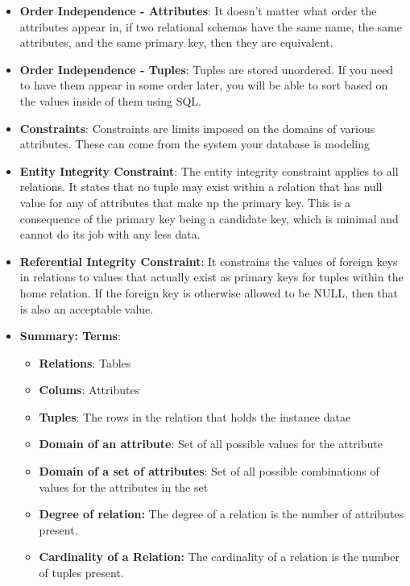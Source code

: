 \documentclass{report}
\begin{document}
\begin{itemize}
        \item \textbf{Order Independence - Attributes}: It doesn’t matter what order the attributes appear in, if two relational schemas have the same name, the same attributes, and the same primary key, then they are equivalent.
        \item \textbf{Order Independence - Tuples}: Tuples are stored unordered. If you need to have them appear in some order later, you will be able to sort based on the values inside of them using SQL.
        \item \textbf{Constraints}: Constraints are limits imposed on the domains of various attributes. These can come from the system your database is modeling
        \item \textbf{Entity Integrity Constraint}: The entity integrity constraint applies to all relations. It states that no tuple may exist within a relation that has null value for any of attributes that make up the primary key. This is a consequence of the primary key being a candidate key, which is minimal and cannot do its job with any less data.
        \item \textbf{Referential Integrity Constraint}: It constrains the values of foreign keys in relations to values that actually exist as primary keys for tuples within the home relation. If the foreign key is otherwise allowed to be NULL, then that is also an acceptable value.
        \item \textbf{Summary: Terms}:
            \begin{itemize}
                \item \textbf{Relations}: Tables
                \item \textbf{Colums}: Attributes
                \item \textbf{Tuples}: The rows in the relation that holds the instance datae
                \item \textbf{Domain of an attribute}: Set of all possible values for the attribute
                \item \textbf{Domain of a set of attributes}: Set of all possible combinations of values for the attributes in the set
                \item \textbf{Degree of relation:} The degree of a relation is the number of attributes present.
                \item \textbf{Cardinality of a Relation:} The cardinality of a relation is the number of tuples present.
            \end{itemize}
    \end{itemize}
\end{document}
